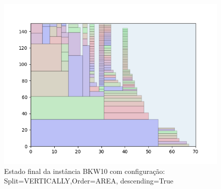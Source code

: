\begin{figure}[H]
    \centering
    \caption[]{Estado final da instância BKW10 com configuração: Split=VERTICALLY,Order=AREA, descending=True}
    \label{fig:bkw10-vertically-area-true}
    \includegraphics[scale=0.5]{output/figures/bkw/bkw10/vertically/area/true/000}
\end{figure}